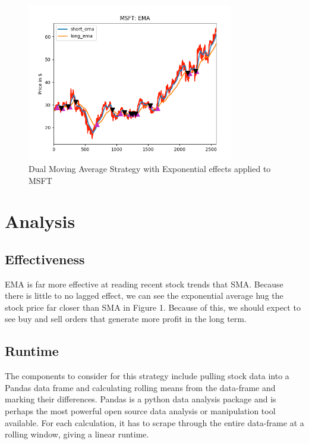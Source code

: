 \documentclass[letterpaper,11pt]{article}
\begin{document}
\begin{figure}[ht!]
\centering
\includegraphics[width=90mm]{EMA_MSFT.png}
\caption{Dual Moving Average Strategy with Exponential effects applied to MSFT \label{overflow}}
\end{figure}

\section*{Analysis}

\subsection*{Effectiveness}
EMA is far more effective at reading recent stock trends that SMA. Because there is little to no lagged effect, we can see the exponential average hug the stock price far closer than SMA in Figure 1. Because of this, we should expect to see buy and sell orders that generate more profit in the long term. 

\subsection*{Runtime}
The components to consider for this strategy include pulling stock data into a Pandas data frame and calculating rolling means from the data-frame and marking their differences. Pandas is a python data analysis package and is perhaps the most powerful open source data analysis or manipulation tool available. For each calculation, it has to scrape through the entire data-frame at a rolling window, giving a linear runtime.
\end{document}
